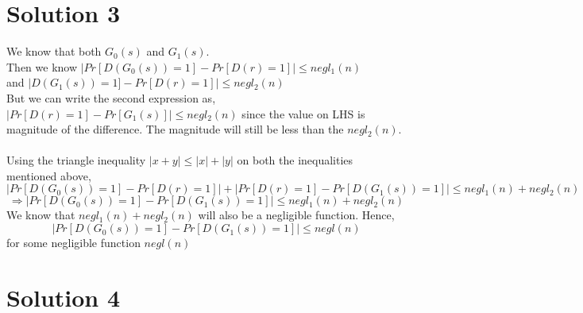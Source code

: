 \documentclass{article}
\begin{document}
    \section*{Solution 3}
            We know that both $G_0(s)$ and $G_1(s)$.\\
            Then we know $|Pr[D(G_0(s)) = 1] - Pr[D(r) = 1]|\leq negl_1(n)$\\
            and $|D(G_1(s)) = 1] - Pr[D(r) = 1]|\leq negl_2(n)$\\
            But we can write the second expression as, $|Pr[D(r) = 1] - Pr[G_1(s)]|\leq negl_2(n)$ since the value on LHS is magnitude of the difference. The magnitude will still be less than the $negl_2(n)$.\\
            \\
            Using the triangle inequality $|x + y|\leq |x| + |y|$ on both the inequalities mentioned above,\\
            $$|Pr[D(G_0(s)) = 1] - Pr[D(r) = 1]| + |Pr[D(r) = 1] - Pr[D(G_1(s)) = 1]| \leq negl_1(n) + negl_2(n)$$
            $$\Rightarrow |Pr[D(G_0(s)) = 1] - Pr[D(G_1(s)) = 1]| \leq negl_1(n) + negl_2(n)$$
            We know that $negl_1(n) + negl_2(n)$ will also be a negligible function. Hence,
            $$|Pr[D(G_0(s)) = 1] - Pr[D(G_1(s)) = 1]| \leq negl(n)$$
            for some negligible function $negl(n)$


    \section*{Solution 4}
\end{document}
